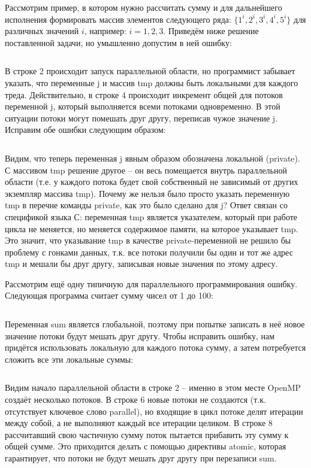 Рассмотрим пример, в котором нужно рассчитать сумму и для дальнейшего исполнения формировать массив элементов следующего ряда: $\{1^i, 2^i, 3^i, 4^i, 5^i\}$ для различных значений $i$, например: $i = 1, 2, 3$. Приведём ниже решение поставленной задачи, но умышленно допустим в ней ошибку:

\inputminted{c++}{listings/OpenMPExample8.cpp}

В строке 2 происходит запуск параллельной области, но программист забывает указать, что переменные j и массив tmp должны быть локальными для каждого треда. Действительно, в строке 4 происходит инкремент общей для потоков переменной j, который выполняется всеми потоками одновременно. В этой ситуации потоки могут помешать друг другу, переписав чужое значение j. Исправим обе ошибки следующим образом:

\inputminted{c++}{listings/OpenMPExample9.cpp}

Видим, что теперь переменная j явным образом обозначена локальной (private). С массивом tmp решение другое – он весь помещается внутрь параллельной области (т.е. у каждого потока будет свой собственный не зависимый от других экземпляр массива tmp). Почему же нельзя было просто указать переменную tmp в перечне команды private, как это было сделано для j? Ответ связан со спецификой языка С: переменная tmp является указателем, который при работе цикла не меняется, но меняется содержимое памяти, на которое указывает tmp. Это значит, что указывание tmp в качестве private-переменной не решило бы проблему с гонками данных, т.к. все потоки получили бы один и тот же адрес tmp и мешали бы друг другу, записывая новые значения по этому адресу.

Рассмотрим ещё одну типичную для параллельного программирования ошибку. Следующая программа считает сумму чисел от 1 до 100:

\inputminted{c++}{listings/OpenMPExample10.cpp}

Переменная sum является глобальной, поэтому при попытке записать в неё новое значение потоки будут мешать друг другу. Чтобы исправить ошибку, нам придётся использовать локальную для каждого потока сумму, а затем потребуется сложить все эти локальные суммы:

\inputminted{c++}{listings/OpenMPExample11.cpp}

Видим начало параллельной области в строке 2 – именно в этом месте OpenMP создаёт несколько потоков. В строке 6 новые потоки не создаются (т.к. отсутствует ключевое слово parallel), но входящие в цикл потоке делят итерации между собой, а не выполняют каждый все итерации целиком. В строке 8 рассчитавший свою частичную сумму поток пытается прибавить эту сумму к общей сумме. Это приходится делать с помощью директивы atomic, которая гарантирует, что потоки не будут мешать друг другу при перезаписи sum. 

